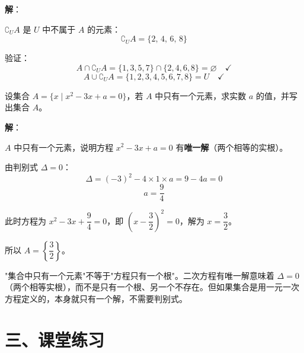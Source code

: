 \documentclass[12pt, a4paper]{ctexart}
\begin{document}
\textbf{解}：

$\complement_U A$ 是 $U$ 中不属于 $A$ 的元素：
\[
\complement_U A = \{2,\, 4,\, 6,\, 8\}
\]

验证：
\[
A \cap \complement_U A = \{1,3,5,7\} \cap \{2,4,6,8\} = \varnothing \quad\checkmark
\]
\[
A \cup \complement_U A = \{1,2,3,4,5,6,7,8\} = U \quad\checkmark
\]

\begin{examplebox}[【例题7】含参集合问题]
设集合 $A = \{x \mid x^2 - 3x + a = 0\}$，若 $A$ 中只有一个元素，求实数 $a$ 的值，并写出集合 $A$。
\end{examplebox}

\textbf{解}：

$A$ 中只有一个元素，说明方程 $x^2 - 3x + a = 0$ 有\textbf{唯一解}（两个相等的实根）。

由判别式 $\Delta = 0$：
\[
\Delta = (-3)^2 - 4 \times 1 \times a = 9 - 4a = 0
\]
\[
a = \frac{9}{4}
\]

此时方程为 $x^2 - 3x + \dfrac{9}{4} = 0$，即 $\left(x - \dfrac{3}{2}\right)^2 = 0$，解为 $x = \dfrac{3}{2}$。

所以 $A = \left\{\dfrac{3}{2}\right\}$。

\begin{warnbox}[易错提醒]
"集合中只有一个元素"不等于"方程只有一个根"。二次方程有唯一解意味着 $\Delta = 0$（两个相等实根），而不是只有一个根、另一个不存在。但如果集合是用一元一次方程定义的，本身就只有一个解，不需要判别式。
\end{warnbox}


\section*{\textcolor{tipgreen}{三、课堂练习}}
\end{document}
